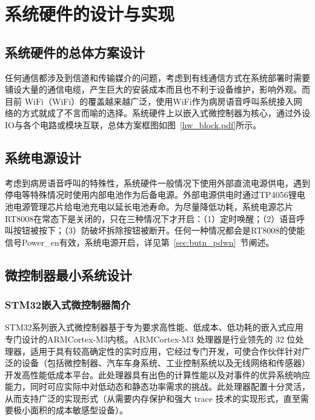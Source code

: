 
\chapter{系统硬件的设计与实现}\label{CH3}
\section{系统硬件的总体方案设计}
任何通信都涉及到信道和传输媒介的问题，考虑到有线通信方式在系统部署时需要铺设大量的通信电缆，产生巨大的安装成本而且也不利于设备维护，影响外观。而目前
\acrshort{WiFi}（\acrlong{WiFi}）的覆盖越来越广泛，使用\acrshort{WiFi}作为病房语音呼叫系统接入网络的方式就成了不言而喻的选择。系统硬件上以嵌入式微控制器为核心，通过外设IO与各个电路或模块互联，总体方案框图如图~\ref{hw_block.pdf}所示。

\section{系统电源设计}
考虑到病房语音呼叫的特殊性，系统硬件一般情况下使用外部直流电源供电，遇到停电等特殊情况时使用内部电池作为后备电源。外部电源供电时通过TP4056锂电池电源管理芯片给电池充电以延长电池寿命。为尽量降低功耗，系统电源芯片RT8008在常态下是关闭的，只在三种情况下才开启：（1）定时唤醒；（2）语音呼叫按钮被按下；（3）防破坏拆除按钮被断开。任何一种情况都会是RT8008的使能信号Power{\_}en有效，系统电源开启，详见第~\ref{sec:butn_pdwn}~节阐述。

\section{微控制器最小系统设计}
\subsection{STM32嵌入式微控制器简介}
STM32系列嵌入式微控制器基于专为要求高性能、低成本、低功耗的嵌入式应用专门设计的ARM\reg Cortex\reg -M3内核。ARM\reg Cortex\reg -M3 处理器是行业领先的 32 位处理器，适用于具有较高确定性的实时应用，它经过专门开发，可使合作伙伴针对广泛的设备（包括微控制器、汽车车身系统、工业控制系统以及无线网络和传感器）开发高性能低成本平台。此处理器具有出色的计算性能以及对事件的优异系统响应能力，同时可应实际中对低动态和静态功率需求的挑战。此处理器配置十分灵活，从而支持广泛的实现形式（从需要内存保护和强大 trace 技术的实现形式，直至需要极小面积的成本敏感型设备）。

